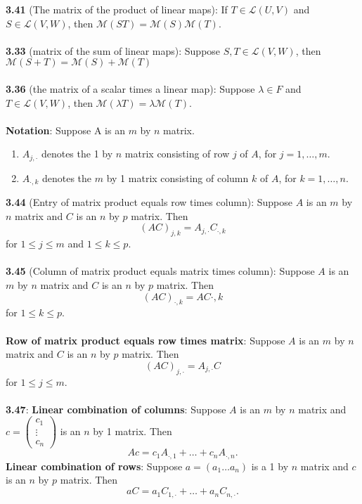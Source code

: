 \documentclass{article}
\theoremstyle{definition}
\begin{document}
\textbf{3.41} (The matrix of the product of linear maps): If $T \in \mathcal{L}(U, V)$ and $S \in \mathcal{L}(V, W)$, then $\mathcal{M}(ST) = \mathcal{M}(S)\mathcal{M}(T)$. \\ \\
\textbf{3.33} (matrix of the sum of linear maps): Suppose $S, T \in \mathcal{L}(V, W)$, then $\mathcal{M}(S + T) = \mathcal{M}(S) + \mathcal{M}(T)$ \\ \\
\textbf{3.36} (the matrix of a scalar times a linear map): Suppose $\lambda \in F$ and $T \in \mathcal{L}(V, W)$, then $\mathcal{M}(\lambda T) = \lambda \mathcal{M}(T)$. \\ \\
\textbf{Notation}: Suppose A is an $m$ by $n$ matrix. \begin{enumerate}
    \item $A_{j, \cdot}$ denotes the 1 by $n$ matrix consisting of row $j$ of $A$, for $j = 1, \dots, m$.
    \item $A_{\cdot, k}$ denotes the $m$ by 1 matrix consisting of column $k$ of $A$, for $k = 1, \dots, n$.
\end{enumerate} $ $ \\
\textbf{3.44} (Entry of matrix product equals row times column): Suppose $A$ is an $m$ by $n$ matrix and $C$ is an $n$ by $p$ matrix. Then $$(AC)_{j, k} = A_{j, \cdot}C_{\cdot, k}$$ for $1 \leq j \leq m$ and $1 \leq k \leq p$. \\ \\
\textbf{3.45} (Column of matrix product equals matrix times column): Suppose $A$ is an $m$ by $n$ matrix and $C$ is an $n$ by $p$ matrix. Then $$(AC)_{\cdot, k} = AC{\cdot, k}$$ for $1 \leq k \leq p$. \\ \\
\textbf{Row of matrix product equals row times matrix}: Suppose $A$ is an $m$ by $n$ matrix and $C$ is an $n$ by $p$ matrix. Then $$(AC)_{j, \cdot} = A_{j, \cdot}C$$ for $1 \leq j \leq m$. \\ \\
\textbf{3.47}: \textbf{Linear combination of columns}: Suppose $A$ is an $m$ by $n$ matrix and $c = \begin{pmatrix}
c_1 \\
\vdots \\
c_n
\end{pmatrix}$ is an $n$ by 1 matrix. Then $$Ac = c_1A_{\cdot, 1} + \dots + c_nA_{\cdot, n}.$$ $ $ \\
\textbf{Linear combination of rows}: Suppose $a = (a_1 \dots a_n)$ is a 1 by $n$ matrix and $c$ is an $n$ by $p$ matrix. Then $$aC = a_1C_{1, \cdot} + \dots + a_nC_{n, \cdot}.$$
\end{document}
